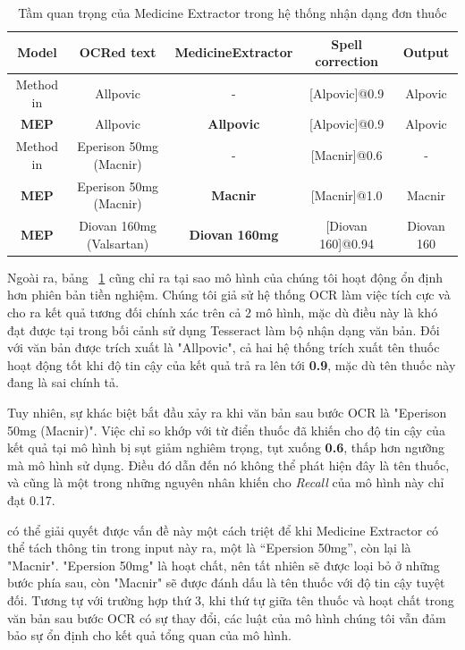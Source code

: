 \begin{table}
\centering
\caption{Tầm quan trọng của Medicine Extractor trong hệ thống nhận dạng đơn thuốc}\label{exp:tab_2}
\begin{adjustbox}{angle=-90}
\begin{tabular}{|c|c|c|c|c|}
\hline
Model           & OCRed text & MedicineExtractor & Spell correction & Output \\ 
\hline
Method in \cite{nguyen2021developing}      & Allpovic & - & [Alpovic]@0.9 & Alpovic     \\ 
\textbf{MEP} & Allpovic & \textbf{Allpovic} & [Alpovic]@0.9 & Alpovic     \\
\hline
Method in \cite{nguyen2021developing}      & Eperison 50mg (Macnir) & - & [Macnir]@0.6 & -      \\ 
\textbf{MEP} & Eperison 50mg (Macnir) & \textbf{Macnir} & [Macnir]@1.0 & Macnir     \\
\hline
\textbf{MEP} & Diovan 160mg (Valsartan) & \textbf{Diovan 160mg} & [Diovan 160]@0.94 & Diovan 160     \\
\hline
\end{tabular}
\end{adjustbox}
\end{table}

Ngoài ra, bảng ~\ref{exp:tab_2} cũng chỉ ra tại sao mô hình của chúng tôi hoạt động ổn định hơn phiên bản tiền nghiệm. Chúng tôi giả sử hệ thống OCR làm việc tích cực và cho ra kết quả tương đối chính xác trên cả 2 mô hình, mặc dù điều này là khó đạt được tại \cite{nguyen2021developing} trong bối cảnh sử dụng Tesseract làm bộ nhận dạng văn bản. Đối với văn bản được trích xuất là "Allpovic", cả hai hệ thống trích xuất tên thuốc hoạt động tốt khi độ tin cậy của kết quả trả ra lên tới \textbf{0.9}, mặc dù tên thuốc này đang là sai chính tả.

Tuy nhiên, sự khác biệt bắt đầu xảy ra khi văn bản sau bước OCR là "Eperison 50mg (Macnir)". Việc chỉ so khớp với từ điển thuốc đã khiến cho độ tin cậy của kết quả tại mô hình \cite{nguyen2021developing} bị sụt giảm nghiêm trọng, tụt xuống \textbf{0.6}, thấp hơn ngưỡng mà mô hình sử dụng. Điều đó dẫn đến nó không thể phát hiện đây là tên thuốc, và cũng là một trong những nguyên nhân khiến cho \textit{Recall} của mô hình này chỉ đạt 0.17.

 có thể giải quyết được vấn đề này một cách triệt để khi Medicine Extractor có thể tách thông tin trong input này ra, một là “Epersion 50mg”, còn lại là "Macnir". "Epersion 50mg" là hoạt chất, nên tất nhiên sẽ được loại bỏ ở những bước phía sau, còn "Macnir" sẽ được đánh dấu là tên thuốc với độ tin cậy tuyệt đối. Tương tự với trường hợp thứ 3, khi thứ tự giữa tên thuốc và hoạt chất trong văn bản sau bước OCR có sự thay đổi, các luật của mô hình chúng tôi vẫn đảm bảo sự ổn định cho kết quả tổng quan của mô hình.

